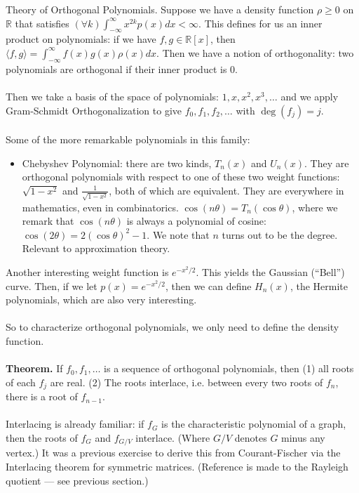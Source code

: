 \documentclass[12pt]{article}
\theoremstyle{remark}
\newcommand{\R}{\mathbb{R}}
\begin{document}
\begin{section}
Theory of Orthogonal Polynomials. Suppose we have a density function $\rho \geq 0$ on $\R$ that satisfies $(\forall k) \int_{-\infty}^{\infty} x^{2k}p(x)dx < \infty$. This defines for us an inner product on polynomials: if we have $f,g \in \R[x]$, then $\langle f,g \rangle = \int_{-\infty}^\infty f(x)g(x)\rho(x)dx$. Then we have a notion of orthogonality: two polynomials are orthogonal if their inner product is $0$. 
\\\\
Then we take a basis of the space of polynomials: $1,x,x^2,x^3,\ldots$ and we apply Gram-Schmidt Orthogonalization to give $f_0,f_1,f_2,\ldots$ with $\deg(f_j) = j$.
\\\\
Some of the more remarkable polynomials in this family:
\begin{itemize}
\item Chebyshev Polynomial: there are two kinds, $T_n(x)$ and $U_n(x)$. They are orthogonal polynomials with respect to one of these two weight functions: $\sqrt{1-x^2}$ and $\frac 1 {\sqrt{1-x^2}}$, both of which are equivalent. They are everywhere in mathematics, even in combinatorics. $\cos(n \theta) = T_n (\cos\theta)$, where we remark that $\cos(n \theta)$ is always a polynomial of cosine: $\cos(2\theta) = 2(\cos \theta)^2 -1$. We note that $n$ turns out to be the degree. Relevant to approximation theory.
\end{itemize}
Another interesting weight function is $e^{-x^2/2}$. This yields the Gaussian (``Bell'') curve. Then, if we let $p(x) = e^{-x^2/2}$, then we can define $H_n(x)$, the Hermite polynomials, which are also very interesting.
\\\\
So to characterize orthogonal polynomials, we only need to define the density function.
\\\\
\textbf{Theorem.} If $f_0,f_1,\ldots$ is a sequence of orthogonal polynomials, then (1) all roots of each $f_j$ are real. (2) The roots interlace, i.e. between every two roots of $f_n$, there is a root of $f_{n-1}$.
\\\\
Interlacing is already familiar: if $f_G$ is the characteristic polynomial of a graph, then the roots of $f_G$ and $f_{G/V}$ interlace. (Where $G/V$ denotes $G$ minus any vertex.) It was a previous exercise to derive this from Courant-Fischer via the Interlacing theorem for symmetric matrices. (Reference is made to the Rayleigh quotient --- see previous section.)

\end{section}
\end{document}
